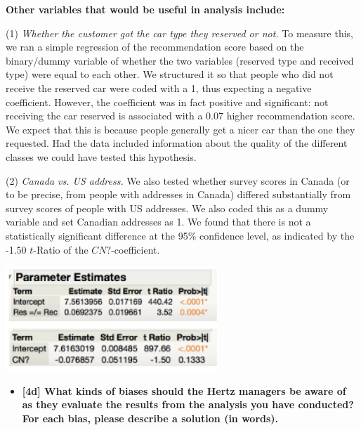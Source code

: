 \documentclass[10pt, oneside,spanish]{article}
\begin{document}
\textbf{Other variables that would be useful in analysis include:}

(1) \textit{Whether the customer got the car type they reserved or not.} To measure this, we ran a simple regression of the recommendation score based on the binary/dummy variable of whether the two variables (reserved type and received type) were equal to each other. We structured it so that people who did not receive the reserved car were coded with a 1, thus expecting a negative coefficient. However, the coefficient was in fact positive and significant: not receiving the car reserved is associated with a 0.07 higher recommendation score. We expect that this is because people generally get a nicer car than the one they requested. Had the data included information about the quality of the different classes we could have tested this hypothesis.

(2) \textit{Canada vs. US address.} We also tested whether survey scores in Canada (or to be precise, from people with addresses in Canada) differed substantially from survey scores of people with US addresses. We also coded this as a dummy variable and set Canadian addresses as 1. We found that there is not a statistically significant difference at the 95\% confidence level, as indicated by the -1.50 $t$-Ratio of the $CN?$-coefficient.

\begin{center}
\includegraphics[width=8cm]{4c.PNG}
\end{center}

\begin{itemize}
\item \textbf{ [4d]  What kinds of biases should the Hertz managers be aware of as they evaluate the results from the analysis you have conducted? For each bias, please describe a solution (in words).   }
\end{itemize}
\end{document}
